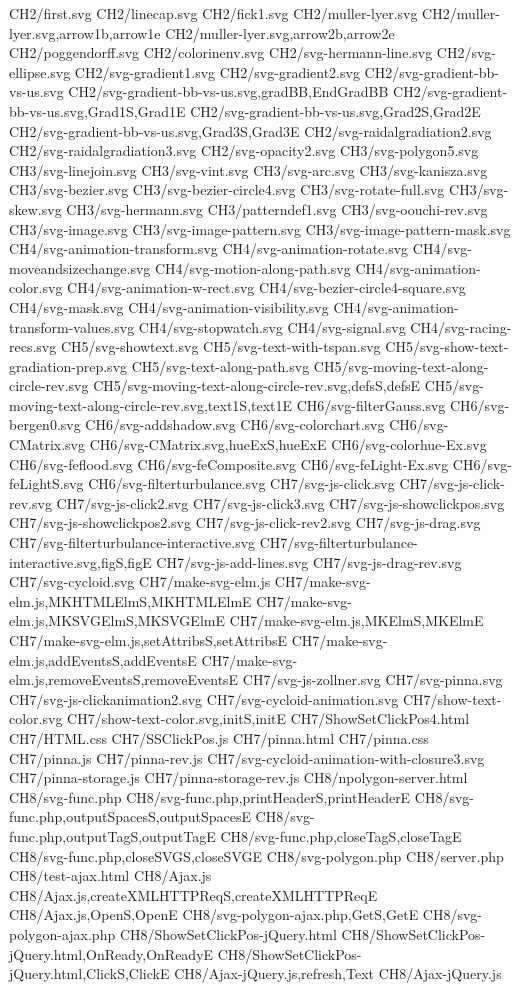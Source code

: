 CH2/first.svg
CH2/linecap.svg
CH2/fick1.svg
CH2/muller-lyer.svg
CH2/muller-lyer.svg,arrow1b,arrow1e
CH2/muller-lyer.svg,arrow2b,arrow2e
CH2/poggendorff.svg
CH2/colorinenv.svg
CH2/svg-hermann-line.svg
CH2/svg-ellipse.svg
CH2/svg-gradient1.svg
CH2/svg-gradient2.svg
CH2/svg-gradient-bb-vs-us.svg
CH2/svg-gradient-bb-vs-us.svg,gradBB,EndGradBB
CH2/svg-gradient-bb-vs-us.svg,Grad1S,Grad1E
CH2/svg-gradient-bb-vs-us.svg,Grad2S,Grad2E
CH2/svg-gradient-bb-vs-us.svg,Grad3S,Grad3E
CH2/svg-raidalgradiation2.svg
CH2/svg-raidalgradiation3.svg
CH2/svg-opacity2.svg
CH3/svg-polygon5.svg
CH3/svg-linejoin.svg
CH3/svg-vint.svg
CH3/svg-arc.svg
CH3/svg-kanisza.svg
CH3/svg-bezier.svg
CH3/svg-bezier-circle4.svg
CH3/svg-rotate-full.svg
CH3/svg-skew.svg
CH3/svg-hermann.svg
CH3/patterndef1.svg
CH3/svg-oouchi-rev.svg
CH3/svg-image.svg
CH3/svg-image-pattern.svg
CH3/svg-image-pattern-mask.svg
CH4/svg-animation-transform.svg
CH4/svg-animation-rotate.svg
CH4/svg-moveandsizechange.svg
CH4/svg-motion-along-path.svg
CH4/svg-animation-color.svg
CH4/svg-animation-w-rect.svg
CH4/svg-bezier-circle4-square.svg
CH4/svg-mask.svg
CH4/svg-animation-visibility.svg
CH4/svg-animation-transform-values.svg
CH4/svg-stopwatch.svg
CH4/svg-signal.svg
CH4/svg-racing-recs.svg
CH5/svg-showtext.svg
CH5/svg-text-with-tspan.svg
CH5/svg-show-text-gradiation-prep.svg
CH5/svg-text-along-path.svg
CH5/svg-moving-text-along-circle-rev.svg
CH5/svg-moving-text-along-circle-rev.svg,defsS,defsE
CH5/svg-moving-text-along-circle-rev.svg,text1S,text1E
CH6/svg-filterGauss.svg
CH6/svg-bergen0.svg
CH6/svg-addshadow.svg
CH6/svg-colorchart.svg
CH6/svg-CMatrix.svg
CH6/svg-CMatrix.svg,hueExS,hueExE
CH6/svg-colorhue-Ex.svg
CH6/svg-feflood.svg
CH6/svg-feComposite.svg
CH6/svg-feLight-Ex.svg
CH6/svg-feLightS.svg
CH6/svg-filterturbulance.svg
CH7/svg-js-click.svg
CH7/svg-js-click-rev.svg
CH7/svg-js-click2.svg
CH7/svg-js-click3.svg
CH7/svg-js-showclickpos.svg
CH7/svg-js-showclickpos2.svg
CH7/svg-js-click-rev2.svg
CH7/svg-js-drag.svg
CH7/svg-filterturbulance-interactive.svg
CH7/svg-filterturbulance-interactive.svg,figS,figE
CH7/svg-js-add-lines.svg
CH7/svg-js-drag-rev.svg
CH7/svg-cycloid.svg
CH7/make-svg-elm.js
CH7/make-svg-elm.js,MKHTMLElmS,MKHTMLElmE
CH7/make-svg-elm.js,MKSVGElmS,MKSVGElmE
CH7/make-svg-elm.js,MKElmS,MKElmE
CH7/make-svg-elm.js,setAttribsS,setAttribsE
CH7/make-svg-elm.js,addEventsS,addEventsE
CH7/make-svg-elm.js,removeEventsS,removeEventsE
CH7/svg-js-zollner.svg
CH7/svg-pinna.svg
CH7/svg-js-clickanimation2.svg
CH7/svg-cycloid-animation.svg
CH7/show-text-color.svg
CH7/show-text-color.svg,initS,initE
CH7/ShowSetClickPos4.html
CH7/HTML.css
CH7/SSClickPos.js
CH7/pinna.html
CH7/pinna.css
CH7/pinna.js
CH7/pinna-rev.js
CH7/svg-cycloid-animation-with-closure3.svg
CH7/pinna-storage.js
CH7/pinna-storage-rev.js
CH8/npolygon-server.html
CH8/svg-func.php
CH8/svg-func.php,printHeaderS,printHeaderE
CH8/svg-func.php,outputSpacesS,outputSpacesE
CH8/svg-func.php,outputTagS,outputTagE
CH8/svg-func.php,closeTagS,closeTagE
CH8/svg-func.php,closeSVGS,closeSVGE
CH8/svg-polygon.php
CH8/server.php
CH8/test-ajax.html
CH8/Ajax.js
CH8/Ajax.js,createXMLHTTPReqS,createXMLHTTPReqE
CH8/Ajax.js,OpenS,OpenE
CH8/svg-polygon-ajax.php,GetS,GetE
CH8/svg-polygon-ajax.php
CH8/ShowSetClickPos-jQuery.html
CH8/ShowSetClickPos-jQuery.html,OnReady,OnReadyE
CH8/ShowSetClickPos-jQuery.html,ClickS,ClickE
CH8/Ajax-jQuery.js,refresh,Text
CH8/Ajax-jQuery.js
